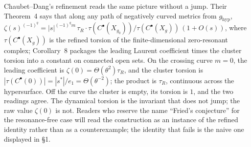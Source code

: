 \documentclass[11pt]{article}
\begin{document}
Chaubet--Dang's refinement reads the same picture without a jump. Their Theorem~4 says that
along any path of negatively curved metrics from $g_{\mathrm{hyp}}$,
$\zeta(s)^{(-1)^q} = |s|^{(-1)^q m}\,\tau_R\cdot\tau(C^\bullet(X_{g_0}))/\tau(C^\bullet(X_g))\,(1+O(s))$,
where $\tau(C^\bullet(X_g))$ is the refined torsion of the finite-dimensional zero-resonant
complex; Corollary~8 packages the leading Laurent coefficient times the cluster torsion into a
constant on connected open sets. On the crossing curve $m = 0$, the leading coefficient is
$\zeta(0) = \Theta(\theta^2)\tau_R$, and the cluster torsion is $|\tau(C^\bullet(0))| = |s^*|/e_1 = \Theta(\theta^{-2})$;
the product is $\tau_R$, continuous across the hypersurface. Off the curve the cluster is empty,
its torsion is $1$, and the two readings agree. The dynamical torsion is the invariant that does
not jump; the raw value $\zeta(0)$ is not. Readers who reserve the name ``Fried's conjecture''
for the resonance-free case will read the construction as an instance of the refined identity
rather than as a counterexample; the identity that fails is the naive one displayed in \S1.
\end{document}
